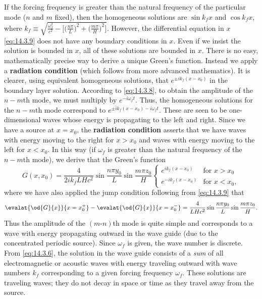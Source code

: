 If the forcing frequency is greater than the natural frequency of the particular mode ($n$ and $m$ fixed), then the homogeneous solutions are $\sin k_f x$ and $\cos k_f x$, where $k_f \equiv \sqrt{\frac{\omega_f^2}{c^2} - \bigl[\bigl(\frac{n\pi}{L}\bigr)^2 + \bigl(\frac{m\pi}{H}\bigr)^2\bigr]}$.  However, the differential equation in $x$ \eqref{eq:14.3.9} does not have any boundary conditions in $x$.  Even if we insist the solution is bounded in $x$, all of these solutions are bounded in $x$.  There is no easy, mathematically precise way to derive a unique Green's function.  Instead we apply a \textbf{radiation condition} (which follows from more advanced mathematics).  It is clearer, using equivalent homogeneous solutions, that $e^{\pm ik_f(x-x_0)}$ in the boundary layer solution.  According to \eqref{eq:14.3.8}, to obtain the amplitude of the $n - m$th mode, we must multiply by $e^{-i\omega_f t}$.  Thus, the homogeneous solutions for the $n-m$th mode correspond to $e^{\pm ik_f(x-x_0)-i\omega_f t}$.  These are seen to be one-dimensional waves whose energy is propagating to the left and right.  Since we have a source at $x = x_0$, the \textbf{radiation condition} asserts that we have waves with energy moving to the right for $x > x_0$ and waves with energy moving to the left for $x < x_0$.  In this way (if $\omega_f$ is greater than the natural frequency of the $n - m$th mode), we derive that the Green's function
\begin{equation}
\label{eq:14.3.10}
G(x,x_0) = \frac{4}{2ik_fLHc^2}\sin\frac{n\pi y_0}{L}\sin\frac{m\pi z_0}{H}\begin{cases} e^{ik_f(x-x_0)} & \text{for } x > x_0 \\ e^{-ik_f(x-x_0)} & \text{for } x < x_0, \end{cases}
\end{equation}
where we have also applied the jump condition following from \eqref{eq:14.3.9} that
\[
\evalat{\od{G}{x}}{x=x_0^+} - \evalat{\od{G}{x}}{x=x_0^-} = \frac{4}{LHc^2}\sin\frac{n\pi y_0}{L}\sin\frac{m\pi z_0}{H}.
\]
Thus the amplitude of the $(m\text{-}n)$th mode is quite simple and corresponds to a wave with energy propagating outward in the wave guide (due to the concentrated periodic source).  Since $\omega_f$ is given, the wave number is discrete.  From \eqref{eq:14.3.6}, the solution in the wave guide consists of a \emph{sum} of all electromagnetic or acoustic waves with energy traveling outward with wave numbers $k_f$ corresponding to a given forcing frequency $\omega_f$.  These solutions are traveling waves; they do not decay in space or time as they travel away from the source.

